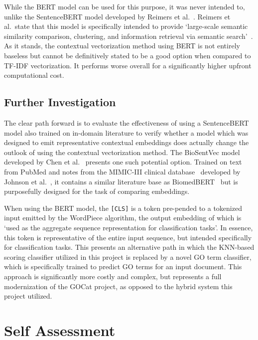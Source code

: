 \documentclass[11pt]{article}
\theoremstyle{plain}
\theoremstyle{definition}
\begin{document}
While the BERT model can be used for this purpose, it was never intended to, unlike the SentenceBERT model developed by Reimers et al.~\cite{reimers/2019/sentence-bert}. Reimers et al.\ state that this model is specifically intended to provide `large-scale semantic similarity comparison, clustering, and information retrieval via semantic search'~\cite{reimers/2019/sentence-bert}. As it stands, the contextual vectorization method using BERT is not entirely baseless but cannot be definitively stated to be a good option when compared to TF-IDF vectorization. It performs worse overall for a significantly higher upfront computational cost.

\subsection{Further Investigation}\label{sec:analysis-further}

The clear path forward is to evaluate the effectiveness of using a SentenceBERT model also trained on in-domain literature to verify whether a model which was designed to emit representative contextual embeddings does actually change the outlook of using the contextual vectorization method. The BioSentVec model developed by Chen et al.~\cite{chen/2018/biosentvec} presents one such potential option. Trained on text from PubMed and notes from the MIMIC-III clinical database~\cite{chen/2018/biosentvec} developed by Johnson et al.\ \cite{johnson/2016/mimic-iii}, it contains a similar literature base as BiomedBERT~\cite{gu/2021/domainspecific} but is purposefully designed for the task of comparing embeddings.

When using the BERT model, the \verb|[CLS]| is a token pre-pended to a tokenized input emitted by the WordPiece algorithm, the output embedding of which is `used as the aggregate sequence representation for classification tasks'\cite{devlin/2018/bert}. In essence, this token is representative of the entire input sequence, but intended specifically for classification tasks. This presents an alternative path in which the KNN-based scoring classifier utilized in this project is replaced by a novel GO term classifier,  which is specifically trained to predict GO terms for an input document. This approach is significantly more costly and complex, but represents a full modernization of the GOCat project, as opposed to the hybrid system this project utilized.

\section{Self Assessment}\label{sec:assessment}
\end{document}
